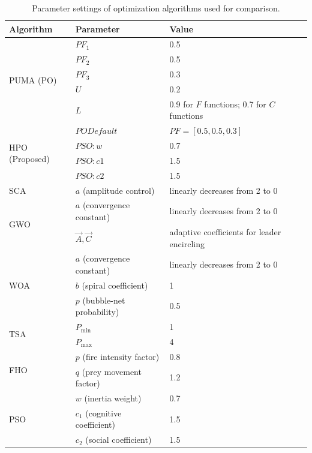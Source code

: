 \documentclass[a4paper,12pt]{article}
\begin{document}
\begin{table}[t]
\centering
\caption{Parameter settings of optimization algorithms used for comparison.}
\label{tab:param_settings_7}
\footnotesize
\begin{tabular}{lll}
\toprule
\textbf{Algorithm} & \textbf{Parameter} & \textbf{Value} \\
\midrule
\multirow{5}{*}{PUMA (PO)~\cite{abdollahzadeh2023puma}} 
 & $PF_1$ & 0.5 \\
 & $PF_2$ & 0.5 \\
 & $PF_3$ & 0.3 \\
 & $U$ & 0.2 \\
 & $L$ & 0.9 for $F$ functions; 0.7 for $C$ functions \\
\midrule
\multirow{4}{*}{HPO (Proposed)} 
 & $PO Default$ & $PF=[0.5,0.5,0.3]$\\
 & $PSO: w$ & 0.7 \\
 & $PSO: c1$ & 1.5 \\
 & $PSO: c2$ & 1.5 \\
\midrule
\multirow{1}{*}{SCA~\cite{mirjalili2016sca}} 
 & $a$ (amplitude control) & linearly decreases from 2 to 0 \\
\midrule
\multirow{2}{*}{GWO~\cite{mirjalili2014gwo}} 
 & $a$ (convergence constant) & linearly decreases from 2 to 0 \\
 & $\vec{A},\vec{C}$ & adaptive coefficients for leader encircling \\
\midrule
\multirow{3}{*}{WOA~\cite{mirjalili2016woa}} 
 & $a$ (convergence constant) & linearly decreases from 2 to 0 \\
 & $b$ (spiral coefficient) & 1 \\
 & $p$ (bubble-net probability) & 0.5 \\
\midrule
\multirow{2}{*}{TSA~\cite{kaur2020tsa}} 
 & $P_{\min}$ & 1 \\
 & $P_{\max}$ & 4 \\
\midrule
\multirow{2}{*}{FHO~\cite{azizi2022fho}} 
 & $p$ (fire intensity factor) & 0.8 \\
 & $q$ (prey movement factor) & 1.2 \\
\midrule
\multirow{3}{*}{PSO~\cite{kennedy1995pso}} 
 & $w$ (inertia weight) & 0.7 \\
 & $c_1$ (cognitive coefficient) & 1.5 \\
 & $c_2$ (social coefficient) & 1.5 \\
\bottomrule
\end{tabular}
\end{table}
\end{document}
